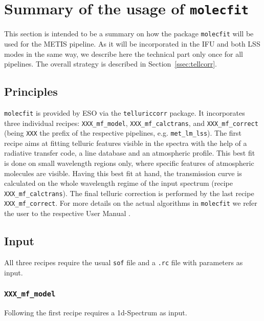 \section{Summary of the usage of \texttt{molecfit}}\label{app:mf}
This section is intended to be a summary on how the package \texttt{molecfit} will be used for the \ac{METIS} pipeline. As it will be incorporated in the \ac{IFU} and both \ac{LSS} modes in the same way, we describe here the technical part only once for all pipelines. The overall strategy is described in Section~\ref{ssec:tellcorr}.
\subsection{Principles}\label{app:mf_principles}
\texttt{molecfit} is provided by \ac{ESO} via the \texttt{telluriccorr} package. It incorporates three individual recipes: \texttt{XXX_mf_model}, \texttt{XXX_mf_calctrans}, and \texttt{XXX_mf_correct} (being \texttt{XXX} the prefix of the respective pipelines, e.g. \texttt{met_lm_lss}). The first recipe aims at fitting telluric features visible in the spectra with the help of a radiative transfer code, a line database and an atmospheric profile. This best fit is done on small wavelength regions only, where specific features of atmospheric molecules are visible. Having this best fit at hand, the transmission curve is calculated on the whole wavelength regime of the input spectrum (recipe \texttt{XXX_mf_calctrans}). The final telluric correction is performed by the last recipe \texttt{XXX_mf_correct}. For more details on the actual algorithms in \texttt{molecfit} we refer the user to the respective User Manual \cite{molecfit}.\\
\subsection{Input}\label{app:mf_input}
All three recipes require the usual \texttt{sof} file and a \texttt{.rc} file with parameters as input.
\subsubsection{\texttt{XXX_mf_model}}
Following \cite{molecfit} the first recipe requires a 1d-Spectrum as input.

